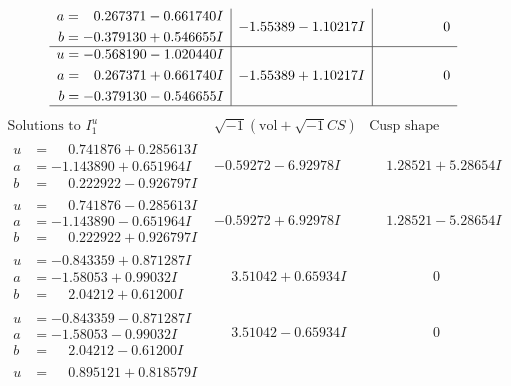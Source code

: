 \documentclass[1p]{elsarticle_modified}
\theoremstyle{definition}
\newcommand{\I}{\sqrt{-1}}
\begin{document}
$$\begin{array}{c|c|c}
\begin{aligned}
a &= \phantom{-}0.267371 - 0.661740 I \\
b &= -0.379130 + 0.546655 I\end{aligned}
 & -1.55389 - 1.10217 I & \phantom{-0.000000 } 0 \\ \hline\begin{aligned}
u &= -0.568190 - 1.020440 I \\
a &= \phantom{-}0.267371 + 0.661740 I \\
b &= -0.379130 - 0.546655 I\end{aligned}
 & -1.55389 + 1.10217 I & \phantom{-0.000000 } 0\\
 \hline 
 \end{array}$$\newpage$$\begin{array}{c|c|c}  
\text{Solutions to }I^u_{1}& \I (\text{vol} + \sqrt{-1}CS) & \text{Cusp shape}\\
 \hline 
\begin{aligned}
u &= \phantom{-}0.741876 + 0.285613 I \\
a &= -1.143890 + 0.651964 I \\
b &= \phantom{-}0.222922 - 0.926797 I\end{aligned}
 & -0.59272 - 6.92978 I & \phantom{-}1.28521 + 5.28654 I \\ \hline\begin{aligned}
u &= \phantom{-}0.741876 - 0.285613 I \\
a &= -1.143890 - 0.651964 I \\
b &= \phantom{-}0.222922 + 0.926797 I\end{aligned}
 & -0.59272 + 6.92978 I & \phantom{-}1.28521 - 5.28654 I \\ \hline\begin{aligned}
u &= -0.843359 + 0.871287 I \\
a &= -1.58053 + 0.99032 I \\
b &= \phantom{-}2.04212 + 0.61200 I\end{aligned}
 & \phantom{-}3.51042 + 0.65934 I & \phantom{-0.000000 } 0 \\ \hline\begin{aligned}
u &= -0.843359 - 0.871287 I \\
a &= -1.58053 - 0.99032 I \\
b &= \phantom{-}2.04212 - 0.61200 I\end{aligned}
 & \phantom{-}3.51042 - 0.65934 I & \phantom{-0.000000 } 0 \\ \hline\begin{aligned}
u &= \phantom{-}0.895121 + 0.818579 I \\

\end{aligned}
\end{array}$$
\end{document}
